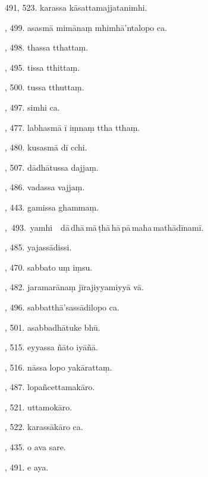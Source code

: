 491, 523. karassa kāsattamajjatanimhi.\hfill \pageref{sut:491}\par {}, 499. asasmā mimānaṃ mhimhā’ntalopo ca.\hfill \pageref{sut:492}\par {}, 498. thassa tthattaṃ.\hfill \pageref{sut:493}\par {}, 495. tissa tthittaṃ.\hfill \pageref{sut:494}\par {}, 500. tussa tthuttaṃ.\hfill \pageref{sut:495}\par {}, 497. simhi ca.\hfill \pageref{sut:496}\par {}, 477. labhasmā ī iṃnaṃ ttha tthaṃ.\hfill \pageref{sut:497}\par {}, 480. kusasmā dī cchi.\hfill \pageref{sut:498}\par {}, 507. dādhātussa dajjaṃ.\hfill \pageref{sut:499}\par {}, 486. vadassa vajjaṃ.\hfill \pageref{sut:500}\par {}, 443. gamissa ghammaṃ.\hfill \pageref{sut:501}\par {},~493.~yamhi\ \ dā\,dhā\,mā\,ṭhā\,hā\,pā\,maha\,mathādīnamī.\hfill \pageref{sut:502}\par {}, 485. yajassādissi.\hfill \pageref{sut:503}\par {}, 470. sabbato uṃ iṃsu.\hfill \pageref{sut:504}\par {}, 482. jaramarānaṃ jīrajiyyamiyyā vā.\hfill \pageref{sut:505}\par {}, 496. sabbatthā’sassādilopo ca.\hfill \pageref{sut:506}\par {}, 501. asabbadhātuke bhū.\hfill \pageref{sut:507}\par {}, 515. eyyassa ñāto iyāñā.\hfill \pageref{sut:508}\par {}, 516. nāssa lopo yakārattaṃ.\hfill \pageref{sut:509}\par {}, 487. lopañcettamakāro.\hfill \pageref{sut:510}\par {}, 521. uttamokāro.\hfill \pageref{sut:511}\par {}, 522. karassākāro ca.\hfill \pageref{sut:512}\par {}, 435. o ava sare.\hfill \pageref{sut:513}\par {}, 491. e aya.\hfill \pageref{sut:514}\par \noindent
